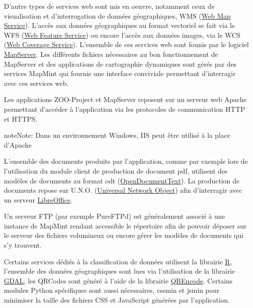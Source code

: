 \documentclass[letterpaper,10pt,french]{sphinxmanual}
\begin{document}
D'autre types de services web sont mis en oeuvre, notamment ceux de
visualisation et d'interrogation de données géographiques, WMS (\href{http://www.opengeospatial.org/standards/wms}{Web
Map Service}). L'accès
aux données géographiques au format vectoriel se fait via le WFS (\href{http://www.opengeospatial.org/standards/wfs}{Web Feature
Service}) ou encore
l'accès aux données images, via le WCS (\href{http://www.opengeospatial.org/standards/wcs}{Web Coverage Service}). L'ensemble de ces
services web sont founis par le logiciel \href{http://mapserver.org}{MapServer}. Les différents fichiers nécessaires au bon
fonctionnement de MapServer et des applications de cartographie
dynamiques sont gérés par des services MapMint qui fournis une
interface conviviale permettant d'interragir avec ces services web.

Les applications ZOO-Project et MapServer reposent sur un serveur web
Apache permettant d'accéder à l'application via les protocoles de
communication HTTP et HTTPS.

\begin{notice}{note}{Note:}
Dans un environnement Windows, IIS peut être utilisé à la
place d'Apache
\end{notice}

L'ensemble des documents produits par l'application, comme par exemple
lors de l'utilisation du module client de production de document pdf,
utilisent des modèles de documents au format odt (\href{https://www.oasis-open.org/committees/tc\_home.php?wg\_abbrev=office}{OpenDocumentText}). La
production de documents repose sur U.N.O. (\href{https://www.openoffice.org/udk/common/man/uno.html}{Universal Network Object}) afin
d'interragir avec un serveur \href{http://www.libreoffice.org/}{LibreOffice}.

Un serveur FTP (par exemple PureFTPd) est généralement associé à une
instance de MapMint rendant accessible le répertoire 
afin de pouvoir déposer sur le serveur des fichiers volumineux ou
encore gérer les modèles de documents qui s'y trouvent.

Certains services dédiés à la classification de données utilisent la
librairie \href{http://r-project.org}{R}, l'ensemble des données
géographiques sont lues via l'utilisation de la librairie \href{http://www.gdal.org}{GDAL}, les QRCodes sont généré à l'aide de la
librairie \href{https://fukuchi.org/works/qrencode/}{QREncode}. Certains
modules Python spécifiques sont aussi nécessaires, cssmin et jsmin
pour minimiser la taille des fichiers CSS et JavaScript générées par
l'application.
\end{document}
